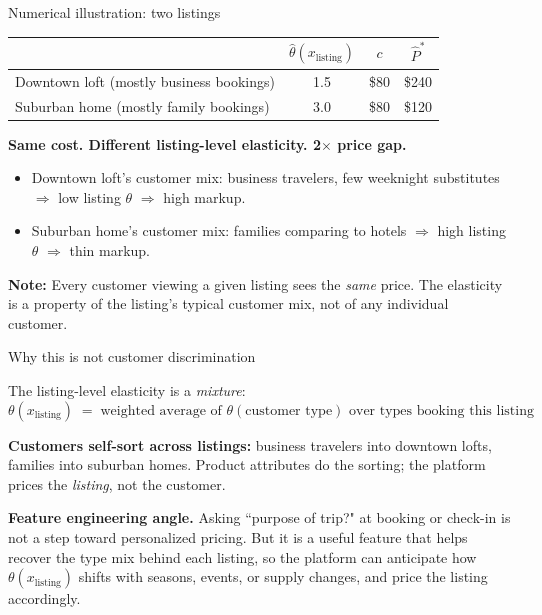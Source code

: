 \documentclass[aspectratio=169, 11pt, handout]{beamer}
\begin{document}
\begin{frame}{Numerical illustration: two listings}

\begin{center}
\begin{tabular}{lccc}
\toprule
 & $\hat\theta(x_{\text{listing}})$ & $c$ & $\hat P^*$ \\
\midrule
Downtown loft (mostly business bookings) & 1.5 & \$80 & \$240 \\
Suburban home (mostly family bookings) & 3.0 & \$80 & \$120 \\
\bottomrule
\end{tabular}
\end{center}

\vspace{1em}

\textbf{Same cost. Different listing-level elasticity. 2$\times$ price gap.}
\vspace{0.6em}

\begin{itemize}
    \item Downtown loft's customer mix: business travelers, few weeknight substitutes $\Rightarrow$ low listing $\theta$ $\Rightarrow$ high markup.
    \item Suburban home's customer mix: families comparing to hotels $\Rightarrow$ high listing $\theta$ $\Rightarrow$ thin markup.
\end{itemize}
\vspace{0.4em}

\small\textcolor{noteblue}{\textbf{Note:}} Every customer viewing a given listing sees the \emph{same} price. The elasticity is a property of the listing's typical customer mix, not of any individual customer.
\end{frame}

\begin{frame}{Why this is not customer discrimination}

The listing-level elasticity is a \emph{mixture}:
\[
\theta(x_{\text{listing}}) \;=\; \text{weighted average of } \theta(\text{customer type}) \text{ over types booking this listing}
\]

\bigskip

\textbf{Customers self-sort across listings:} business travelers into downtown lofts, families into suburban homes. Product attributes do the sorting; the platform prices the \emph{listing}, not the customer.

\bigskip

\textbf{Feature engineering angle.} Asking ``purpose of trip?" at booking or check-in is not a step toward personalized pricing. But it is a useful feature that helps recover the type mix behind each listing, so the platform can anticipate how $\theta(x_{\text{listing}})$ shifts with seasons, events, or supply changes, and price the listing accordingly.

\end{frame}
\end{document}

